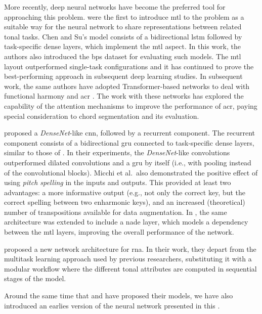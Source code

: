 More recently, deep neural networks have become the
preferred tool for approaching this problem.
\textcite{chen2018functional} were the first to introduce
\gls{mtl} \parencite{ruder2017overview} to the problem as a
suitable way for the neural network to share representations
between related tonal tasks. Chen and Su's model consists of
a bidirectional \gls{lstm} \parencite{hochreiter1997long}
followed by task-specific dense layers, which implement the
\gls{mtl} aspect. In this work, the authors also introduced
the \gls{bps} dataset for evaluating such models. The
\gls{mtl} layout outperformed single-task configurations and
it has continued to prove the best-performing approach in
subsequent deep learning studies. In subsequent work, the
same authors have adopted Transformer-based networks to deal
with functional harmony and \gls{acr}
\parencite{chen2019harmony, chen2021attend}. The work with
these networks has explored the capability of the attention
mechanisms to improve the performance of \gls{acr}, paying
special consideration to chord segmentation and its
evaluation.

\textcite{micchi2020not} proposed a \emph{DenseNet}-like
\parencite{huang2017densely} \gls{cnn}, followed by a
recurrent component. The recurrent component consists of a
bidirectional \gls{gru} \parencite{cho2014learning}
connected to task-specific dense layers, similar to those of
\textcite{chen2018functional}. In their experiments, the
\emph{DenseNet}-like convolutions outperformed dilated
convolutions and a \gls{gru} by itself (i.e., with pooling
instead of the convolutional blocks). Micchi et al.~also
demonstrated the positive effect of using \emph{pitch
spelling} in the inputs and outputs. This provided at least
two advantages: a more informative output (e.g., not only
the correct key, but the correct spelling between two
enharmonic keys), and an increased (theoretical) number of
transpositions available for data augmentation. In
\textcite{micchi2021deep}, the same architecture was
extended to include a \gls{nade} layer, which models a
dependency between the \gls{mtl} layers, improving the
overall performance of the network.

\textcite{mcleod2021modular} proposed a new network
architecture for \gls{rna}. In their work, they depart from
the multitask learning approach used by previous
researchers, substituting it with a modular workflow where
the different tonal attributes are computed in sequential
stages of the model.

Around the same time that \textcite{micchi2021deep} and
\textcite{mcleod2021modular} have proposed their models, we
have also introduced an earlies version of the neural
network presented in this \thesisdiss{}
\parencite{napoleslopez2021augmentednet}.
